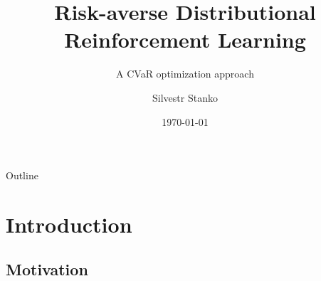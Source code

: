 \documentclass{beamer}
\title{Risk-averse Distributional Reinforcement Learning}
\subtitle{A CVaR optimization approach}
\author{Silvestr Stanko\inst{1}}
\institute[] %
{
  \inst{1}%
  Department of Computer Science\\
  Czech Technical University
  }
\date{\today}
\begin{document}
\begin{frame}
  \titlepage
\end{frame}

\begin{frame}{Outline}
  \tableofcontents
\end{frame}

\section{Introduction}

\subsection{Motivation}
\end{document}
